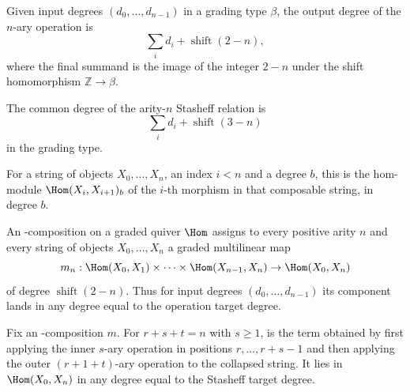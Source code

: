 \begin{definition}
\label{AInfinityTheory.operationTargetDeg}
\leanok
{}
Given input degrees $(d_0,\dots,d_{n-1})$ in a grading type $\beta$, the
output degree of the $n$-ary operation is
\[
  \sum_i d_i + \operatorname{shift}(2-n),
\]
where the final summand is the image of the integer $2-n$ under the shift
homomorphism $\mathbb{Z} \to \beta$.
\end{definition}

\begin{definition}
\label{AInfinityTheory.stasheffTargetDeg}
\leanok
{}
The common degree of the arity-$n$ Stasheff relation is
\[
  \sum_i d_i + \operatorname{shift}(3-n)
\]
in the grading type.
\end{definition}

\begin{definition}
\label{AInfinityTheory.GradedLinearQuiver.ComposableHomType}
\leanok
{}
For a string of objects $X_0,\dots,X_n$, an index $i < n$ and a degree $b$,
this is the hom-module $\Hom(X_i, X_{i+1})_b$ of the $i$-th morphism in that
composable string, in degree $b$.
\end{definition}

\begin{definition}
\label{AInfinityTheory.AInfinityComposition}
\leanok
{}
An \Ainf{}-composition on a graded quiver $\Hom$ assigns to every positive arity
$n$ and every string of objects $X_0,\dots,X_n$ a graded multilinear map
\[
  m_n : \Hom(X_0,X_1) \times \cdots \times \Hom(X_{n-1},X_n) \to \Hom(X_0,X_n)
\]
of degree $\operatorname{shift}(2-n)$. Thus for input degrees
$(d_0,\dots,d_{n-1})$ its component lands in any degree equal to the operation
target degree.
\end{definition}

\begin{definition}
\label{AInfinityTheory.indexedStasheffTerm}
\leanok
{}
Fix an \Ainf{}-composition $m$. For $r + s + t = n$ with $s \geq 1$,
 is the term obtained by first applying the inner
$s$-ary operation in positions $r,\dots,r+s-1$ and then applying the outer
$(r+1+t)$-ary operation to the collapsed string. It lies in
$\Hom(X_0,X_n)$ in any degree equal to the Stasheff target degree.
\end{definition}

